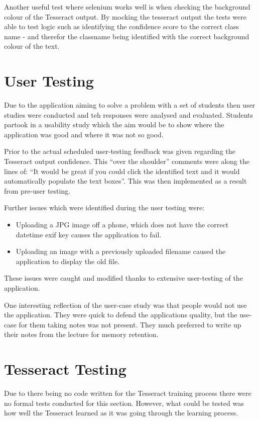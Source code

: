 Another useful test where selenium works well is when checking the background colour of the Tesseract output. By mocking the tesseract output the tests were able to test logic such as identifying the confidence score to the correct class name - and therefor the classname being identified with the correct background colour of the text.
\section{User Testing}
Due to the application aiming to solve a problem with a set of students then user studies were conducted and teh responses were analysed and evaluated. Students partook in a usability study which the aim would be to show where the application was good and where it was not so good.

Prior to the actual scheduled user-testing feedback was given regarding the Tesseract output confidence. This ``over the shoulder'' comments were along the lines of: ``It would be great if you could click the identified text and it would automatically populate the text boxes''. This was then implemented as a result from pre-user testing.

Further issues which were identified during the user testing were:
\begin{itemize}
  \item Uploading a JPG image off a phone, which does not have the correct datetime exif key causes the application to fail.
  \item Uploading an image with a previously uploaded filename caused the application to display the old file.
\end{itemize}

These issues were caught and modified thanks to extensive user-testing of the application.

One interesting reflection of the user-case study was that people would not use the application. They were quick to defend the applications quality, but the use-case for them taking notes was not present. They much preferred to write up their notes from the lecture for memory retention.
\section{Tesseract Testing}
Due to there being no code written for the Tesseract training process there were no formal tests conducted for this section. However, what could be tested was how well the Tesseract learned as it was going through the learning process.

